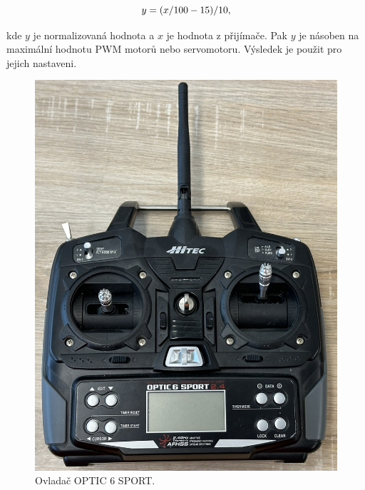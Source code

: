\begin{equation}
	\centering
	y = (x / 100 - 15) / 10,
\end{equation}

kde $y$ je normalizovaná hodnota a $x$ je hodnota z přijímače. Pak $y$ je násoben
na maximální hodnotu PWM motorů nebo servomotoru. Výsledek je použit pro
jejich nastaveni.

\begin{figure}[!h]
    \centering
    \includegraphics[width = 0.5\linewidth]{Figures/Joystick.png}
    \caption{Ovladač OPTIC 6 SPORT.}
    \label{fig:Joystick}
\end{figure}

\endinput

